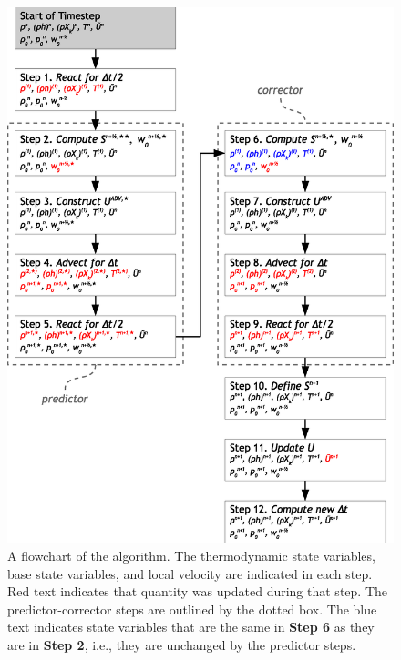 \begin{figure}[tb]
\centering
\includegraphics[scale=0.6]{flowchart}
\caption{\label{Fig:flowchart} A flowchart of the algorithm.  The
  thermodynamic state variables, base state variables, and local velocity are
  indicated in each step.  Red text indicates that quantity was
  updated during that step.  The predictor-corrector steps are
  outlined by the dotted box.  The blue text indicates state
  variables that are the same in {\bf Step 6} as they are in
  {\bf Step 2}, i.e., they are unchanged by the predictor steps.}
\end{figure}
